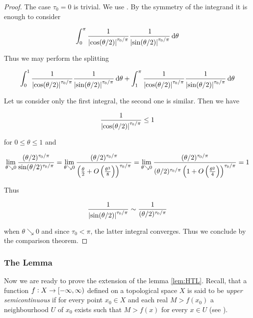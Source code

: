 \begin{proof}
	The case $\tau_0 = 0$ is trivial. We use \cite[153--154]{elstrodt:mass:2011}. By the symmetry of the integrand it is enough to consider 

	\begin{equation*}
		\int_{0}^\pi \frac{1}{\abs[0]{ \cos(\theta/2) }^{\tau_0/\pi}}\frac{1}{\abs[0]{ \sin(\theta/2) }^{\tau_0/\pi}} \d \theta
	\end{equation*}

	Thus we may perform the splitting 
	
	\begin{equation*}
		\int_{0}^1 \frac{1}{\abs[0]{ \cos(\theta/2) }^{\tau_0/\pi}}\frac{1}{\abs[0]{ \sin(\theta/2) }^{\tau_0/\pi}} \d \theta + \int_{1}^\pi \frac{1}{\abs[0]{ \cos(\theta/2) }^{\tau_0/\pi}}\frac{1}{\abs[0]{ \sin(\theta/2) }^{\tau_0/\pi}} \d\theta
	\end{equation*}
	
	Let us consider only the first integral, the second one is similar. Then we have 
	
	\begin{equation*}
		\frac{1}{\abs[0]{ \cos(\theta/2) }^{\tau_0/\pi}} \leq 1 	
	\end{equation*}
	
	\noindent for $0 \leq \theta \leq 1$ and 
	
	\begin{equation*}
		\lim_{\theta \searrow 0} \frac{(\theta/2)^{\tau_0/\pi}}{\sin(\theta/2)^{\tau_0/\pi}} = \lim_{\theta \searrow 0} \frac{(\theta/2)^{\tau_0/\pi}}{\del[2]{\frac{\theta}{2} + O\del{\frac{\theta^3}{8}}}^{\tau_0/\pi}} = \lim_{\theta \searrow 0} \frac{(\theta/2)^{\tau_0/\pi}}{(\theta/2)^{\tau_0/\pi}\del[2]{1 + O\del{\frac{\theta^2}{4}}}^{\tau_0/\pi}} = 1 
	\end{equation*}
	
	Thus 
	
	\begin{equation*}
		\frac{1}{\abs[0]{ \sin(\theta/2) }^{\tau_0/\pi}} \sim\frac{1}{( \theta/2 )^{\tau_0/\pi}}
	\end{equation*}
	
	\noindent when $\theta \searrow 0$ and since $\tau_0 < \pi$, the latter integral converges. Thus we conclude by the comparison theorem.
\end{proof}

\subsubsection{The Lemma}
Now we are ready to prove the extension of the lemma \ref{lem:HTL}.  Recall, that a function $f: X \to \intco{-\infty,\infty}$ defined on a topological space $X$ is said to be \emph{upper semicontinuous} if for every point $x_0 \in X$ and each real $M > f( x_0 )$ a neighbourhood $U$ of $x_0$ exists such that $M > f( x )$ for every $x \in U$ (see \cite[199]{rao:complex_analysis:1991}).

